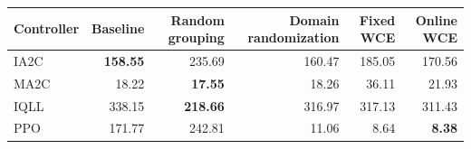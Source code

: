 \begin{tabular}{lrrrrr}
\hline
Controller & Baseline & Random grouping & Domain randomization & Fixed WCE & Online WCE \\
\hline
IA2C & \textbf{158.55} & 235.69 & 160.47 & 185.05 & 170.56 \\
MA2C & 18.22 & \textbf{17.55} & 18.26 & 36.11 & 21.93 \\
IQLL & 338.15 & \textbf{218.66} & 316.97 & 317.13 & 311.43 \\
PPO & 171.77 & 242.81 & 11.06 & 8.64 & \textbf{8.38} \\
\hline
\end{tabular}

